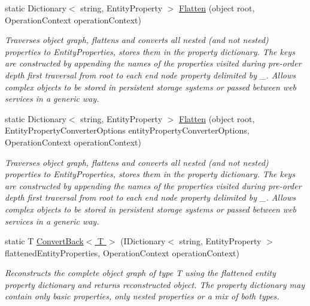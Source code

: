\begin{DoxyCompactItemize}
\item 
static Dictionary$<$ string, Entity\+Property $>$ \hyperlink{classMicrosoft_1_1WindowsAzure_1_1Storage_1_1Table_1_1EntityPropertyConverter_ab1aaabbbfb7723aa066a418ca312a565}{Flatten} (object root, Operation\+Context operation\+Context)
\begin{DoxyCompactList}\small\item\em Traverses object graph, flattens and converts all nested (and not nested) properties to Entity\+Properties, stores them in the property dictionary. The keys are constructed by appending the names of the properties visited during pre-\/order depth first traversal from root to each end node property delimited by \textquotesingle{}\+\_\+\textquotesingle{}. Allows complex objects to be stored in persistent storage systems or passed between web services in a generic way. \end{DoxyCompactList}\item 
static Dictionary$<$ string, Entity\+Property $>$ \hyperlink{classMicrosoft_1_1WindowsAzure_1_1Storage_1_1Table_1_1EntityPropertyConverter_a45373e2614d05c18ecb74bdcafc572b6}{Flatten} (object root, Entity\+Property\+Converter\+Options entity\+Property\+Converter\+Options, Operation\+Context operation\+Context)
\begin{DoxyCompactList}\small\item\em Traverses object graph, flattens and converts all nested (and not nested) properties to Entity\+Properties, stores them in the property dictionary. The keys are constructed by appending the names of the properties visited during pre-\/order depth first traversal from root to each end node property delimited by \textquotesingle{}\+\_\+\textquotesingle{}. Allows complex objects to be stored in persistent storage systems or passed between web services in a generic way. \end{DoxyCompactList}\item 
static T \hyperlink{classMicrosoft_1_1WindowsAzure_1_1Storage_1_1Table_1_1EntityPropertyConverter_afb4edd95dfd79d576091119b5ac13ad7}{Convert\+Back$<$ T $>$} (I\+Dictionary$<$ string, Entity\+Property $>$ flattened\+Entity\+Properties, Operation\+Context operation\+Context)
\begin{DoxyCompactList}\small\item\em Reconstructs the complete object graph of type T using the flattened entity property dictionary and returns reconstructed object. The property dictionary may contain only basic properties, only nested properties or a mix of both types. \end{DoxyCompactList}\item 

\end{DoxyCompactItemize}
